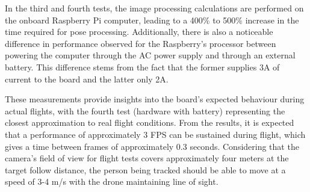 In the third and fourth tests, the image processing calculations are performed on the onboard Raspberry Pi computer, leading to a 400\% to 500\% increase in the time required for pose processing. Additionally, there is also a noticeable difference in performance observed for the Raspberry's processor between powering the computer through the AC power supply and through an external battery. This difference stems from the fact that the former supplies 3A of current to the board and the latter only 2A.

These measurements provide insights into the board's expected behaviour during actual flights, with the fourth test (hardware with battery) representing the closest approximation to real flight conditions. From the results, it is expected that a performance of approximately 3 FPS can be sustained during flight, which gives a time between frames of approximately 0.3 seconds. Considering that the camera's field of view for flight tests covers approximately four meters at the target follow distance, the person being tracked should be able to move at a speed of 3-4 m/s with the drone maintaining line of sight.
